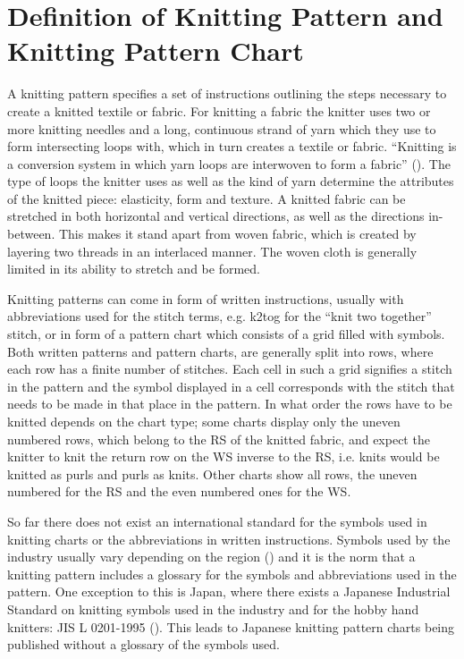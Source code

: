 \section{Definition of Knitting Pattern and Knitting Pattern Chart}

A knitting pattern specifies a set of instructions outlining the steps necessary to create a knitted textile or fabric. For knitting a fabric the knitter uses two or more knitting needles and a long, continuous strand of yarn which they use to form intersecting loops with, which in turn creates a textile or fabric. ``Knitting is a conversion system in which yarn loops are interwoven to form a fabric'' (\cite[p17]{Raz1993}). The type of loops the knitter uses as well as the kind of yarn determine the attributes of the knitted piece: elasticity, form and texture. A knitted fabric can be stretched in both horizontal and vertical directions, as well as the directions in-between. This makes it stand apart from woven fabric, which is created by layering two threads in an interlaced manner. The woven cloth is generally limited in its ability to stretch and be formed.

Knitting patterns can come in form of written instructions, usually with abbreviations used for the stitch terms, e.g. k2tog for the ``knit two together'' stitch, or in form of a pattern chart which consists of a grid filled with symbols. Both written patterns and pattern charts, are generally split into rows, where each row has a finite number of stitches. Each cell in such a grid signifies a stitch in the pattern and the symbol displayed in a cell corresponds with the stitch that needs to be made in that place in the pattern. In what order the rows have to be knitted depends on the chart type; some charts display only the uneven numbered rows, which belong to the \gls{RS} of the knitted fabric, and expect the knitter to knit the return row on the \gls{WS} inverse to the \gls{RS}, i.e. knits would be knitted as purls and purls as knits. Other charts show all rows, the uneven numbered for the \gls{RS} and the even numbered ones for the WS.

So far there does not exist an international standard for the symbols used in knitting charts or the abbreviations in written instructions. Symbols used by the industry usually vary depending on the region (\cite[p57]{Raz1993}) and it is the norm that a knitting pattern includes a glossary for the symbols and abbreviations used in the pattern. One exception to this is Japan, where there exists a Japanese Industrial Standard on knitting symbols used in the industry and for the hobby hand knitters: JIS L 0201-1995 (\cite{JKCA1995}). This leads to Japanese knitting pattern charts being published without a glossary of the symbols used.

